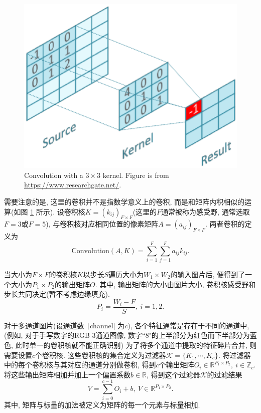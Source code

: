 \documentclass[12pt]{ctexart}
\begin{document}
\begin{figure}[H]
  \centering
\includegraphics[scale=.15]{7.png} 
\caption{Convolution with a $3\times3$ kernel. Figure is from \url{https://www.researchgate.net/}.}
\label{fig4}
\end{figure}
需要注意的是, 这里的卷积并不是指数学意义上的卷积, 而是和矩阵内积相似的运算(如图 \ref{fig4} 所示). 设卷积核$K=(k_{ij})_{F \times F}$(这里的$F$通常被称为感受野, 通常选取$F=3$或$F=5$), 与卷积核对应相同位置的像素矩阵$A=(a_{ij})_{F\times F}$. 两者卷积的定义为
$$\mathrm{Convolution}(A,K)=\sum_{i=1}^{F}\sum_{j=1}^{F}a_{ij}k_{ij}.$$

当大小为$F\times F$的卷积核$K$以步长$S$遍历大小为$W_{1}\times W_{2}$的输入图片后, 便得到了一个大小为$P_{1}\times P_{2}$的输出矩阵$O$. 其中, 输出矩阵的大小由图片大小, 卷积核感受野和步长共同决定(暂不考虑边缘填充). 
$$P_{i}=\frac{W_{i}-F}{S}, \ i=1,2.$$

对于多通道图片(设通道数 \texttt|channel| 为$c$), 各个特征通常是存在于不同的通道中,(例如, 对于手写数字的RGB 3通道图像, 数字``8"的上半部分为红色而下半部分为蓝色, 此时单一的卷积核就不能正确识别) 为了将多个通道中提取的特征碎片合并, 则需要设置$c$个卷积核. 这些卷积核的集合定义为过滤器$\mathcal{K}=\{K_{1},\cdots,K_{c}\}$.
将过滤器中的每个卷积核与其对应的通道分别做卷积, 得到$c$个输出矩阵$O_{i}\in \mathbb{R}^{P_{1}\times P_{2}},\ i\in \mathbb{Z}_{c}$.将这些输出矩阵相加并加上一个偏置系数$b\in \mathbb{R}$, 得到这个过滤器$\mathcal{K}$的过滤结果
$$V=\sum_{i=0}^{c-1}O_{i}+b,\ V\in \mathbb{R}^{P_{1}\times P_{2}}.$$
其中, 矩阵与标量的加法被定义为矩阵的每一个元素与标量相加.
\end{document}
